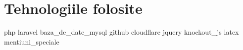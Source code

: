 \chapter{Tehnologiile folosite}
{php}
{laravel}
{baza_de_date_mysql}
{github}
{cloudflare}
{jquery}
{knockout_js}
{latex}
{mentiuni_speciale}
